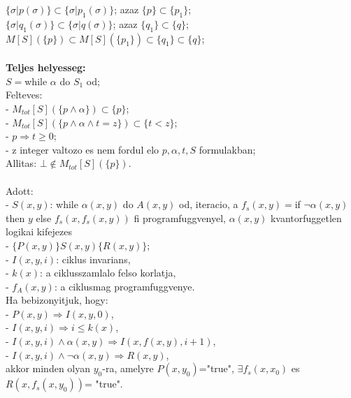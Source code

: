 \documentclass[a4paper,10pt]{article}
\begin{document}
\indent $\lbrace\sigma \vert p(\sigma)\rbrace\subset\lbrace\sigma\vert p_1(\sigma)\rbrace$; azaz $\lbrace p\rbrace\subset\lbrace p_1\rbrace$;\\
\indent $\lbrace\sigma\vert q_1(\sigma)\rbrace\subset\lbrace\sigma\vert q(\sigma)\rbrace$; azaz $\lbrace q_1\rbrace\subset\lbrace q\rbrace$;\\
$M[S](\lbrace p\rbrace)\subset M[S](\lbrace p_1\rbrace)\subset \lbrace q_1\rbrace\subset\lbrace q\rbrace$;\\
\\
\textbf{Teljes helyesseg:}\\
$S=$while $\alpha$ do $S_1$ od;\\
Felteves:\\
\indent - $M_{tot}[S](\lbrace p\wedge \alpha\rbrace)\subset\lbrace p\rbrace$;\\
\indent - $M_{tot}[S](\lbrace p\wedge \alpha \wedge t=z\rbrace)\subset \lbrace t<z\rbrace$;\\
\indent - $p \Rightarrow t\ge0$;\\
\indent - z integer valtozo es nem fordul elo $p, \alpha, t, S$ formulakban;\\
Allitas: $\bot \not\in M_{tot}[S](\lbrace p\rbrace)$.\\
\\
Adott:\\
\indent - $S(x,y)$: while $\alpha(x,y)$ do $A(x,y)$ od, iteracio, a $f_s(x,y)=$if $\neg\alpha(x,y)$ then $y$ else $f_s(x,f_s(x,y))$ fi programfuggvenyel, $\alpha(x,y)$ kvantorfuggetlen logikai kifejezes\\
\indent - $\lbrace P(x,y)\rbrace S(x,y)\lbrace R(x,y)\rbrace$;\\
\indent - $I(x,y,i)$: ciklus invarians,\\
\indent - $k(x)$: a ciklusszamlalo felso korlatja,\\
\indent - $f_A(x,y)$: a ciklusmag programfuggvenye.\\
Ha bebizonyitjuk, hogy:\\
\indent - $P(x,y) \Rightarrow I(x,y,0)$,\\
\indent - $I(x,y,i) \Rightarrow i\le k(x)$,\\
\indent - $I(x,y,i)\wedge\alpha(x,y) \Rightarrow I(x, f(x,y), i+1)$,\\
\indent - $I(x,y,i) \wedge \neg\alpha(x,y) \Rightarrow R(x,y)$,\\
akkor minden olyan $y_0$-ra, amelyre $P(x,y_0)$="true", $\exists f_s(x,x_0)$ es $R(x, f_s(x,y_0))$= "true".\\
\end{document}
